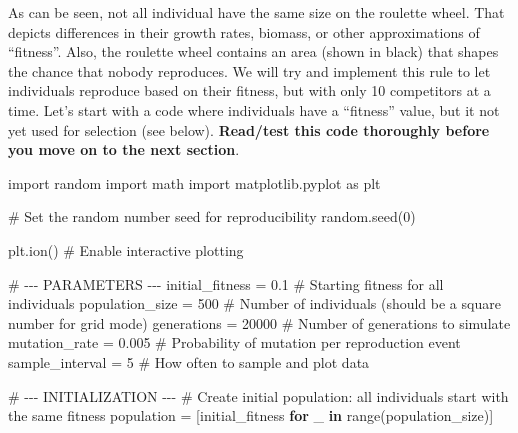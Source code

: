 \documentclass[
  letterpaper,
  DIV=11,
  numbers=noendperiod]{scrreprt}
\newenvironment{Shaded}{\begin{snugshade}}{\end{snugshade}}
\newcommand{\BuiltInTok}[1]{\textcolor[rgb]{0.00,0.23,0.31}{#1}}
\newcommand{\CommentTok}[1]{\textcolor[rgb]{0.37,0.37,0.37}{#1}}
\newcommand{\ControlFlowTok}[1]{\textcolor[rgb]{0.00,0.23,0.31}{\textbf{#1}}}
\newcommand{\DecValTok}[1]{\textcolor[rgb]{0.68,0.00,0.00}{#1}}
\newcommand{\FloatTok}[1]{\textcolor[rgb]{0.68,0.00,0.00}{#1}}
\newcommand{\ImportTok}[1]{\textcolor[rgb]{0.00,0.46,0.62}{#1}}
\newcommand{\KeywordTok}[1]{\textcolor[rgb]{0.00,0.23,0.31}{\textbf{#1}}}
\newcommand{\NormalTok}[1]{\textcolor[rgb]{0.00,0.23,0.31}{#1}}
\newcommand{\OperatorTok}[1]{\textcolor[rgb]{0.37,0.37,0.37}{#1}}
\theoremstyle{definition}
\theoremstyle{remark}
\begin{document}
As can be seen, not all individual have the same size on the roulette
wheel. That depicts differences in their growth rates, biomass, or other
approximations of ``fitness''. Also, the roulette wheel contains an area
(shown in black) that shapes the chance that nobody reproduces. We will
try and implement this rule to let individuals reproduce based on their
fitness, but with only 10 competitors at a time. Let's start with a code
where individuals have a ``fitness'' value, but it not yet used for
selection (see below). \textbf{Read/test this code thoroughly before you
move on to the next section}.

\begin{tcolorbox}[enhanced jigsaw, left=2mm, opacitybacktitle=0.6, toptitle=1mm, colbacktitle=quarto-callout-note-color!10!white, toprule=.15mm, coltitle=black, colframe=quarto-callout-note-color-frame, opacityback=0, title=\textcolor{quarto-callout-note-color}{\faInfo}\hspace{0.5em}{CODE FOR ``fitness without fitness''}, breakable, bottomtitle=1mm, rightrule=.15mm, titlerule=0mm, arc=.35mm, leftrule=.75mm, bottomrule=.15mm, colback=white]

\begin{Shaded}
\begin{Highlighting}[]
\ImportTok{import}\NormalTok{ random}
\ImportTok{import}\NormalTok{ math}
\ImportTok{import}\NormalTok{ matplotlib.pyplot }\ImportTok{as}\NormalTok{ plt}

\CommentTok{\# Set the random number seed for reproducibility}
\NormalTok{random.seed(}\DecValTok{0}\NormalTok{)}

\NormalTok{plt.ion()  }\CommentTok{\# Enable interactive plotting}

\CommentTok{\# {-}{-}{-} PARAMETERS {-}{-}{-}}
\NormalTok{initial\_fitness }\OperatorTok{=} \FloatTok{0.1}            \CommentTok{\# Starting fitness for all individuals}
\NormalTok{population\_size }\OperatorTok{=} \DecValTok{500}             \CommentTok{\# Number of individuals (should be a square number for grid mode)}
\NormalTok{generations }\OperatorTok{=} \DecValTok{20000}               \CommentTok{\# Number of generations to simulate}
\NormalTok{mutation\_rate }\OperatorTok{=} \FloatTok{0.005}            \CommentTok{\# Probability of mutation per reproduction event}
\NormalTok{sample\_interval }\OperatorTok{=} \DecValTok{5}               \CommentTok{\# How often to sample and plot data}

\CommentTok{\# {-}{-}{-} INITIALIZATION {-}{-}{-}}
\CommentTok{\# Create initial population: all individuals start with the same fitness}
\NormalTok{population }\OperatorTok{=}\NormalTok{ [initial\_fitness }\ControlFlowTok{for}\NormalTok{ \_ }\KeywordTok{in} \BuiltInTok{range}\NormalTok{(population\_size)]}


\end{Highlighting}
\end{Shaded}
\end{tcolorbox}
\end{document}
